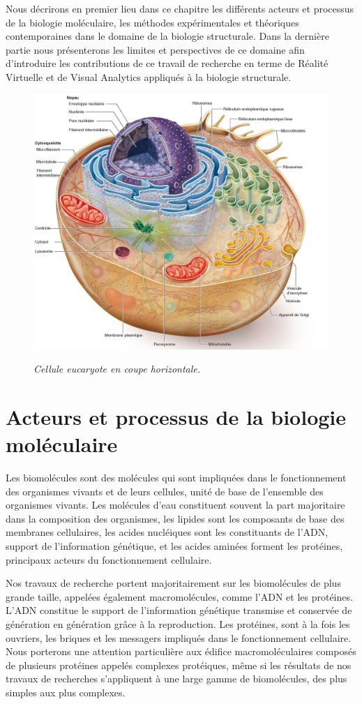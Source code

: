 Nous décrirons en premier lieu dans ce chapitre les différents acteurs et processus de la biologie moléculaire, les méthodes expérimentales et théoriques contemporaines dans le domaine de la biologie structurale. Dans la dernière partie nous présenterons les limites et perspectives de ce domaine afin d'introduire les contributions de ce travail de recherche en terme de Réalité Virtuelle et de Visual Analytics appliqués à la biologie structurale. 

\begin{figure}[h]
  \centering
  {\includegraphics[width=0.85\linewidth]{./figures/ch1/cellule}}
    \caption{\it Cellule eucaryote en coupe horizontale.}
    \label{Fig:cellule}
  \hspace{0.2cm}
\end{figure}

\section{Acteurs et processus de la biologie moléculaire}

Les biomolécules sont des molécules qui sont impliquées dans le fonctionnement des organismes vivants et de leurs cellules, unité de base de l’ensemble des organismes vivants. Les molécules d'eau constituent souvent la part majoritaire dans la composition des organismes, les lipides sont les composants de base des membranes cellulaires, les acides nucléiques sont les constituants de l'ADN, 
support de l'information génétique, et les acides aminées forment les protéines, principaux acteurs du fonctionnement cellulaire.

Nos travaux de recherche portent majoritairement sur les biomolécules de plus grande taille, appelées également macromolécules, comme l'ADN et les protéines. L'ADN constitue le support de l'information génétique transmise et conservée de génération en génération grâce à la reproduction. Les protéines, sont à la fois les ouvriers, les briques et les messagers impliqués dans le fonctionnement cellulaire. Nous porterons une attention particulière aux édifice macromoléculaires composés de plusieurs protéines appelés complexes protéiques, même si les résultats de nos travaux de recherches s'appliquent à une large gamme de biomolécules, des plus simples aux plus complexes.

